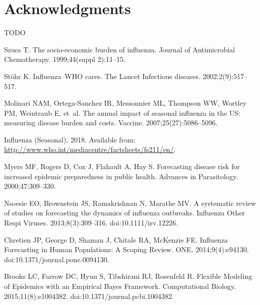 \documentclass[10pt,letterpaper]{article}
\begin{document}
\section*{Acknowledgments}

TODO

\nolinenumbers


%

\begin{thebibliography}{10}

Szucs T.
\newblock The socio-economic burden of influenza.
\newblock Journal of Antimicrobial Chemotherapy. 1999;44(suppl 2):11--15.

St{\"o}hr K.
\newblock Influenza--WHO cares.
\newblock The Lancet Infectious diseases. 2002;2(9):517--517.

Molinari NAM, Ortega-Sanchez IR, Messonnier ML, Thompson WW, Wortley PM,
  Weintraub E, et~al.
\newblock The annual impact of seasonal influenza in the US: measuring disease
  burden and costs.
\newblock Vaccine. 2007;25(27):5086--5096.

Influenza (Seasonal); 2018.
\newblock Available from:
  \url{http://www.who.int/mediacentre/factsheets/fs211/en/}.

Myers MF, Rogers D, Cox J, Flahault A, Hay S.
\newblock Forecasting disease risk for increased epidemic preparedness in
  public health.
\newblock Advances in Parasitology. 2000;47:309--330.

Nsoesie EO, Brownstein JS, Ramakrishnan N, Marathe MV.
\newblock A systematic review of studies on forecasting the dynamics of
  influenza outbreaks.
\newblock Influenza Other Respi Viruses. 2013;8(3):309--316.
\newblock doi:{10.1111/irv.12226}.

Chretien JP, George D, Shaman J, Chitale RA, McKenzie FE.
\newblock Influenza Forecasting in Human Populations: A Scoping Review.
 {ONE}. 2014;9(4):e94130.
\newblock doi:{10.1371/journal.pone.0094130}.

Brooks LC, Farrow DC, Hyun S, Tibshirani RJ, Rosenfeld R.
\newblock Flexible Modeling of Epidemics with an Empirical Bayes Framework.
 Computational Biology. 2015;11(8):e1004382.
\newblock doi:{10.1371/journal.pcbi.1004382}.


\end{thebibliography}
\end{document}
